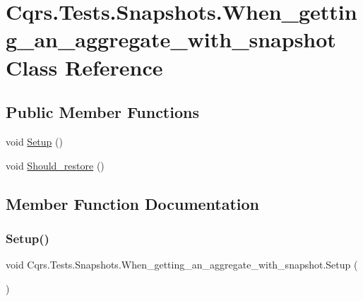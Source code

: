 \hypertarget{classCqrs_1_1Tests_1_1Snapshots_1_1When__getting__an__aggregate__with__snapshot}{}\section{Cqrs.\+Tests.\+Snapshots.\+When\+\_\+getting\+\_\+an\+\_\+aggregate\+\_\+with\+\_\+snapshot Class Reference}
\label{classCqrs_1_1Tests_1_1Snapshots_1_1When__getting__an__aggregate__with__snapshot}
\subsection*{Public Member Functions}
\begin{DoxyCompactItemize}
\item 
void \hyperlink{classCqrs_1_1Tests_1_1Snapshots_1_1When__getting__an__aggregate__with__snapshot_a25f0b56fe36be101b7fe4f38db502254}{Setup} ()
\item 
void \hyperlink{classCqrs_1_1Tests_1_1Snapshots_1_1When__getting__an__aggregate__with__snapshot_a48aea1a3e8b6248e2bc1225f8c549d24}{Should\+\_\+restore} ()
\end{DoxyCompactItemize}


\subsection{Member Function Documentation}
\mbox{\label{classCqrs_1_1Tests_1_1Snapshots_1_1When__getting__an__aggregate__with__snapshot_a25f0b56fe36be101b7fe4f38db502254}} 
\subsubsection{\texorpdfstring{Setup()}{Setup()}}
{\footnotesize\ttfamily void Cqrs.\+Tests.\+Snapshots.\+When\+\_\+getting\+\_\+an\+\_\+aggregate\+\_\+with\+\_\+snapshot.\+Setup (\begin{DoxyParamCaption}{ }\end{DoxyParamCaption})}

